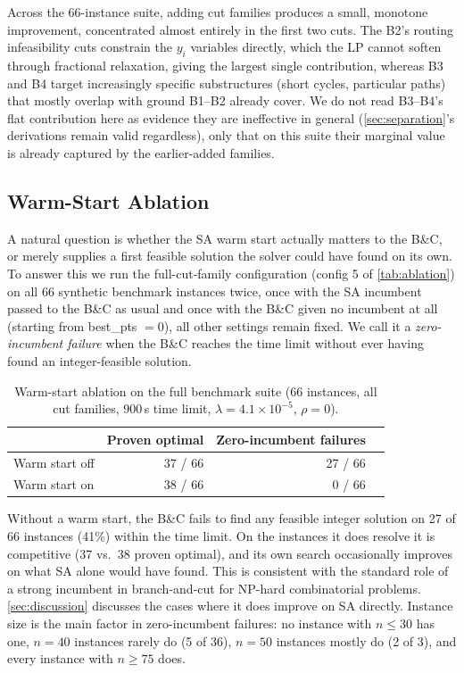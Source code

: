 \documentclass[11pt,a4paper]{article}
\begin{document}
Across the 66-instance suite, adding cut families produces a small, monotone improvement, concentrated almost entirely in the first two cuts.
The B2's routing infeasibility cuts constrain the $y_i$ variables directly, which the LP cannot soften through fractional relaxation, giving the largest single contribution, whereas B3 and B4 target increasingly specific substructures (short cycles, particular paths) that mostly overlap with ground B1--B2 already cover.
We do not read B3--B4's flat contribution here as evidence they are ineffective in general (\cref{sec:separation}'s derivations remain valid regardless), only that on this suite their marginal value is already captured by the earlier-added families.

\subsection{Warm-Start Ablation}
\label{sec:warmstart_ablation}

A natural question is whether the SA warm start actually matters to the B\&C, or merely supplies a first feasible solution the solver could have found on its own.
To answer this we run the full-cut-family configuration (config 5 of \cref{tab:ablation}) on all 66 synthetic benchmark instances twice, once with the SA incumbent passed to the B\&C as usual and once with the B\&C given no incumbent at all (starting from best\_pts $= 0$), all other settings remain fixed.
We call it a \emph{zero-incumbent failure} when the B\&C reaches the time limit without ever having found an integer-feasible solution.

\begin{table}[H]
\centering
\caption{Warm-start ablation on the full benchmark suite (66 instances, all cut families, 900\,s time limit, $\lambda = 4.1\times10^{-5}$, $\rho = 0$).}
\label{tab:warmstart_ablation}
\begin{tabular}{lrrr}
\toprule
& \textbf{Proven optimal} & \textbf{Zero-incumbent failures} \\
\midrule
Warm start off & 37 / 66 & 27 / 66 \\
Warm start on  & 38 / 66 &  0 / 66 \\
\bottomrule
\end{tabular}
\end{table}

Without a warm start, the B\&C fails to find any feasible integer solution on 27 of 66 instances (41\%) within the time limit.
On the instances it does resolve it is competitive (37 vs.\ 38 proven optimal), and its own search occasionally improves on what SA alone would have found.
This is consistent with the standard role of a strong incumbent in branch-and-cut for NP-hard combinatorial problems. \cref{sec:discussion} discusses the cases where it does improve on SA directly.
Instance size is the main factor in zero-incumbent failures: no instance with $n \leq 30$ has one, $n = 40$ instances rarely do (5 of 36), $n = 50$ instances mostly do (2 of 3), and every instance with $n \geq 75$ does.
\end{document}
